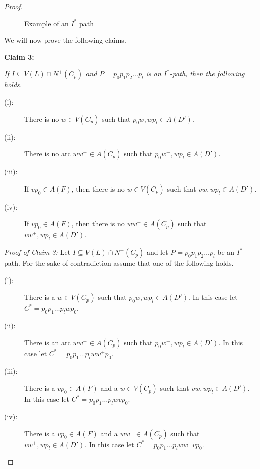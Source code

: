 \documentclass{article}
\newcommand{\2}{\vspace{2mm}}
\theoremstyle{plain}
\theoremstyle{definition}
\newcommand{\greencolor}{green}
\newcommand{\greenline}{solid}
\newcommand{\bluecolor}{blue}
\newcommand{\blueline}{solid}
\newcommand{\thickline}{thin}
\begin{document}
\begin{proof}
\begin{figure}
\caption{Example of an $I^*$ path} \label{fig:path}
\end{figure}

We will now prove the following claims.

\2

{\bf Claim 3:} {\em If $I \subseteq V(L) \cap N^+(C_p)$ and $P=p_0 p_1 p_2 \ldots p_l$ is an $I^*$-path, then the following holds.

\begin{description}
\item[(i):] There is no $w \in V(C_p)$ such that $p_0w,wp_l \in A(D')$.
\item[(ii):] There is no arc $w w^+ \in A(C_p)$ such that $p_0w^+,wp_l \in A(D')$.
\item[(iii):] If $v p_0 \in A(F)$, then there is no $w \in V(C_p)$ such that $vw,wp_l \in A(D')$.
\item[(iv):] If $v p_0 \in A(F)$, then there is no $ww^+ \in A(C_p)$ such that $vw^+,wp_l \in A(D')$.
\end{description}
}

\2

{\em Proof of Claim 3:} Let $I \subseteq V(L) \cap N^+(C_p)$ and let $P=p_0 p_1 p_2 \ldots p_l$ be an $I^*$-path. 
For the sake of contradiction assume that one of the following holds.

\begin{description}
\item[(i):] There is a $w \in V(C_p)$ such that $p_0w,wp_l \in A(D')$. In this case let 
$C^*=p_0p_1\ldots p_lwp_0$.
\item[(ii):] There is an arc $w w^+ \in A(C_p)$ such that $p_0w^+,wp_l \in A(D')$. In this case let 
$C^*=p_0p_1\ldots p_lww^+p_0$.
\item[(iii):] There is a $v p_0 \in A(F)$ and a $w \in V(C_p)$ such that $vw,wp_l \in A(D')$. In this case let 
$C^*=p_0p_1\ldots p_lwvp_0$.
\item[(iv):] There is a $v p_0 \in A(F)$  and a $ww^+ \in A(C_p)$ such that $vw^+,wp_l \in A(D')$. In this case let
$C^*=p_0p_1\ldots p_lww^+vp_0$.
\end{description}


\end{proof}
\end{document}
